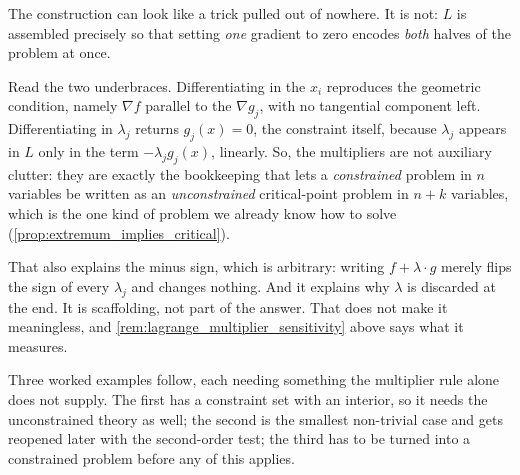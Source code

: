 \begin{remark}
\label{rem:why_the_lagrangian}
The construction can look like a trick pulled out of nowhere. It is not: $L$ is assembled
precisely so that setting \emph{one} gradient to zero encodes \emph{both} halves of the problem
at once.

Read the two underbraces. Differentiating in the $x_i$ reproduces the geometric condition, namely
$\nabla f$ parallel to the $\nabla g_j$, with no tangential component left. Differentiating in
$\lambda_j$ returns $g_j(x)=0$, the constraint itself, because $\lambda_j$ appears in $L$ only
in the term $-\lambda_jg_j(x)$, linearly. So, the multipliers are not auxiliary clutter: they are
exactly the bookkeeping that lets a \emph{constrained} problem in $n$ variables be written as an
\emph{unconstrained} critical-point problem in $n+k$ variables, which is the one kind of problem
we already know how to solve (\cref{prop:extremum_implies_critical}).

That also explains the minus sign, which is arbitrary: writing $f + \lambda\cdot g$ merely flips
the sign of every $\lambda_j$ and changes nothing. And it explains why $\lambda$ is discarded at
the end. It is scaffolding, not part of the answer. That does not make it meaningless, and
\cref{rem:lagrange_multiplier_sensitivity} above says what it measures.
\end{remark}

Three worked examples follow, each needing something the multiplier rule alone does not supply.
The first has a constraint set with an interior, so it needs the unconstrained theory as
well; the second is the smallest non-trivial case and gets reopened later with the second-order
test; the third has to be turned into a constrained problem before any of this applies.

